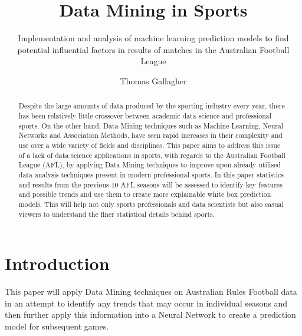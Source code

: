 \documentclass{imc-inf}
\title{Data Mining in Sports}
\subtitle{Implementation and analysis of machine learning prediction models to find potential influential factors in results of matches in the Australian Football League}
\author{Thomas Gallagher}
\begin{document}
	\frontmatter\maketitle{}
	
	
	\begin{declarations}\end{declarations}
	
	
	
	\begin{abstract}
		Despite the large amounts of data produced by the sporting industry every year, there has been relatively little crossover between academic data science and professional sports. On the other hand, Data Mining techniques such as Machine Learning, Neural Networks and Association Methods, have seen rapid increases in their complexity and use over a wide variety of fields and disciplines. 
		This paper aims to address this issue of a lack of data science applications in sports, with regards to the Australian Football League (AFL), by applying Data Mining techniques to improve upon already utilised data analysis techniques present in modern professional sports. In this paper statistics and results from the previous 10 AFL seasons will be assessed to identify key features and possible trends and use them to create more explainable white box prediction models. This will help not only sports professionals and data scientists but also casual viewers to understand the finer statistical details behind sports.
		
	\end{abstract}
	
	
	
	\tableofcontents%
	\clearpage
	
	
	\listoftables
	
	
	\mainmatter%
	
	\chapter{Introduction}\label{chap:introduction}
	
	This paper will apply Data Mining techniques on Australian Rules Football data in an attempt to identify any trends that may occur in individual seasons and then further apply this information into a Neural Network to create a prediction model for subsequent games.
	
\end{document}
